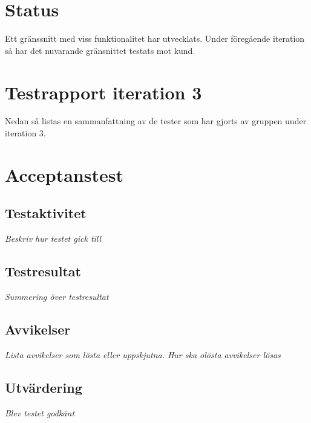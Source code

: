 \documentclass[a4paper,10pt, twoside]{article}
\begin{document}


\newpage
\section{Status}
Ett gränssnitt med viss funktionalitet har utvecklats. Under föregående iteration så har det nuvarande gränsnittet testats mot kund.  

\section{Testrapport iteration 3}
Nedan så listas en sammanfattning av de tester som har gjorts av gruppen under iteration 3.  

\section{Acceptanstest}
\subsection{Testaktivitet}
\emph{Beskriv hur testet gick till}
\subsection{Testresultat}
\emph{Summering över testresultat}
\subsection{Avvikelser}
\emph{Lista avvikelser som lösta eller uppskjutna. Hur ska olösta avvikelser lösas}
\subsection{Utvärdering}
\emph{Blev testet godkänt}
\end{document}
